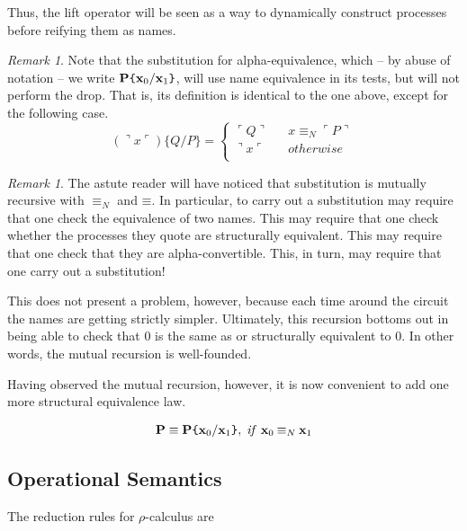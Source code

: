 \documentclass[]{amsart}
\newcommand{\lpquote}{\ulcorner}
\newcommand{\rpquote}{\urcorner}
\newcommand{\id}[1]{\texttt{#1}}
\newcommand{\pzero}{\mathbin{0}}
\newcommand{\juxtap}{\mathbin{\id{|}}}
\newcommand{\concat}{\mathbin{\id{.}}}
\newcommand{\scong}{\mathbin{\equiv}}
\newcommand{\nameeq}{\mathbin{\equiv_N}}
\newcommand{\quotep}[1]{\lpquote #1 \rpquote}
\newcommand{\dropn}[1]{\rpquote #1 \lpquote}
\newcommand{\substn}[2]{\id{\{} #1 / #2 \id{\}}}
\newcommand{\red}{\rightarrow}
\newcommand{\category}[1]{\mbox{\bf #1}}
\theoremstyle{definition}
\theoremstyle{remark}
\newtheorem{rem}[thm]{Remark}
\numberwithin{equation}{subsection}
\newcommand{\rhoc}{$\rho$-calculus}
\begin{document}
Thus, the lift operator will be seen as a way to dynamically
construct processes before reifying them as names.

\begin{rem}
	Note that the substitution for alpha-equivalence, which -- by
	abuse of notation -- we write $\category{P}
	\substn{\category{x}_0}{\category{x}_1}$, will use name
	equivalence in its tests, but will not perform the drop. That
	is, its definition is identical to the one above, except for
	the following case.
\begin{equation*}
	(\dropn{x}) \substn{Q}{P}       
		= 
		\left\{ 
			\begin{array}{ccc} 
				\quotep{Q} & & x \nameeq \quotep{P} \\
                              	\dropn{x} & & otherwise \\
			\end{array}
		\right.	
\end{equation*}
\end{rem}

\begin{rem}
	The astute reader will have noticed that substitution is
	mutually recursive with $\nameeq$ and $\scong$. In particular,
	to carry out a substitution may require that one check the
	equivalence of two names. This may require that one check
	whether the processes they quote are structurally
	equivalent. This may require that one check that they are
	alpha-convertible. This, in turn, may require that one carry
	out a substitution!
	
	This does not present a problem, however, because each time
	around the circuit the names are getting strictly
	simpler. Ultimately, this recursion bottoms out in being able
	to check that $\pzero$ is the same as or structurally
	equivalent to $\pzero$. In other words, the mutual recursion
	is well-founded.
	
	Having observed the mutual recursion, however, it is now convenient to
	add one more structural equivalence law.
\end{rem}

\begin{eqnarray*}
 \category{P} \equiv \category{P} \substn{\category{x}_0}{\category{x}_1}, \; \mbox{\textit{if} }\category{x}_0 \nameeq \category{x}_1
\end{eqnarray*}

\subsection{Operational Semantics}
The reduction rules for {\rhoc}  are
\end{document}
